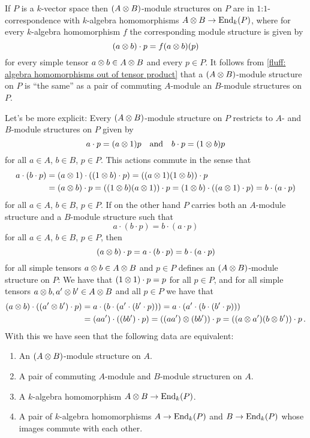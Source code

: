 \begin{fluff}
  \label{fluff: commuting modules structures for tensor products}
  If $P$ is a $k$-vector space then $(A \mathbin{\otimes} B)$-module structures on $P$ are in $1$:$1$-correspondence with $k$-algebra homomorphisms $A \mathbin{\otimes} B \to \operatorname{End}_k(P)$, where for every $k$-algebra homomorphism $f$ the corresponding module structure is given by
  \[
      (a \mathbin{\otimes} b) \cdot p
    = f(a \mathbin{\otimes} b)(p)
  \]
  for every simple tensor $a \mathbin{\otimes} b \in A \mathbin{\otimes} B$ and every $p \in P$.
  It follows from \ref{fluff: algebra homomorphisms out of tensor product} that a $(A \mathbin{\otimes} B)$-module structure on $P$ is \enquote{the same} as a pair of commuting $A$-module an $B$-module structures on $P$.
  
  Let’s be more explicit:
  Every $(A \mathbin{\otimes} B)$-module structure on $P$ restricts to $A$- and $B$-module structures on $P$ given by
  \[
      a \cdot p
    = (a \mathbin{\otimes} 1) p
    \quad\text{and}\quad
      b \cdot p
    = (1 \mathbin{\otimes} b) p
  \]
  for all $a \in A$, $b \in B$, $p \in P$.
  This actions commute in the sense that
  \begin{align*}
        a \cdot (b \cdot p)
    &=  (a \mathbin{\otimes} 1) \cdot ( (1 \mathbin{\otimes} b) \cdot p )
     =  ((a \mathbin{\otimes} 1) (1 \mathbin{\otimes} b)) \cdot p \\
    &=  (a \mathbin{\otimes} b) \cdot p
     =  ((1 \mathbin{\otimes} b) (a \mathbin{\otimes} 1)) \cdot p
     =  (1 \mathbin{\otimes} b) \cdot ( (a \mathbin{\otimes} 1) \cdot p )
     =  b \cdot (a \cdot p)
  \end{align*}
  for all $a \in A$, $b \in B$, $p \in P$.
  If on the other hand $P$ carries both an $A$-module structure and a $B$-module structure such that
  \[
      a \cdot (b \cdot p)
    = b \cdot (a \cdot p)
  \]
  for all $a \in A$, $b \in B$, $p \in P$, then
  \[
      (a \mathbin{\otimes} b) \cdot p
    = a \cdot (b \cdot p)
    = b \cdot (a \cdot p)
  \]
  for all simple tensors $a \mathbin{\otimes} b \in A \mathbin{\otimes} B$ and $p \in P$ defines an $(A \mathbin{\otimes} B)$-module structure on $P$:
  We have that $(1 \mathbin{\otimes} 1) \cdot p = p$ for all $p \in P$, and for all simple tensors $a \mathbin{\otimes} b, a' \mathbin{\otimes} b' \in A \mathbin{\otimes} B$ and all $p \in P$ we have that
  \begin{align*}
        (a \mathbin{\otimes} b) \cdot ( (a' \mathbin{\otimes} b') \cdot p )
    &=  a \cdot (b \cdot (a' \cdot (b' \cdot p)))
     =  a \cdot (a' \cdot (b \cdot (b' \cdot p))) \\
    &=  (aa') \cdot ( (bb') \cdot p )
     =  ((aa') \mathbin{\otimes} (bb')) \cdot p
     =  ( (a \mathbin{\otimes} a') (b \mathbin{\otimes} b') ) \cdot p \,.
  \end{align*}
  With this we have seen that the following data are equivalent:
  \begin{enumerate}
    \item
      An $(A \mathbin{\otimes} B)$-module structure on $A$.
    \item
      A pair of commuting $A$-module and $B$-module structuren on $A$.
    \item
      A $k$-algebra homomorphism $A \mathbin{\otimes} B \to \operatorname{End}_k(P)$.
    \item
      A pair of $k$-algebra homomorphisms $A \to \operatorname{End}_k(P)$ and $B \to \operatorname{End}_k(P)$ whose images commute with each other.
  \end{enumerate}
  

\end{fluff}
